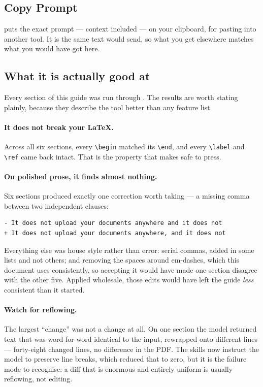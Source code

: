 \subsection{Copy Prompt}

 puts the exact prompt --- context included --- on your
clipboard, for pasting into another tool. It is the same text  would
send, so what you get elsewhere matches what you would have got here.

\subsection{What it is actually good at}
\label{sec:ai-measured}

Every section of this guide was run through . The results
are worth stating plainly, because they describe the tool better than any
feature list.

\paragraph{It does not break your \LaTeX.}
Across all six sections, every \verb|\begin| matched its \verb|\end|, and every
\verb|\label| and \verb|\ref| came back intact. That is the property that makes
 safe to press.

\paragraph{On polished prose, it finds almost nothing.}
Six sections produced exactly one correction worth taking --- a missing comma
between two independent clauses:

\begin{lstlisting}
- It does not upload your documents anywhere and it does not
+ It does not upload your documents anywhere, and it does not
\end{lstlisting}

Everything else was house style rather than error: serial commas, added in some
lists and not others; and removing the spaces around em-dashes, which this
document uses consistently, so accepting it would have made one section
disagree with the other five. Applied wholesale, those edits would have left
the guide \emph{less} consistent than it started.

\paragraph{Watch for reflowing.}
The largest ``change'' was not a change at all. On one section the model
returned text that was word-for-word identical to the input, rewrapped onto
different lines --- forty-eight changed lines, no difference in the PDF. The
skills now instruct the model to preserve line breaks, which reduced that to
zero, but it is the failure mode to recognise: a diff that is enormous and
entirely uniform is usually reflowing, not editing.

